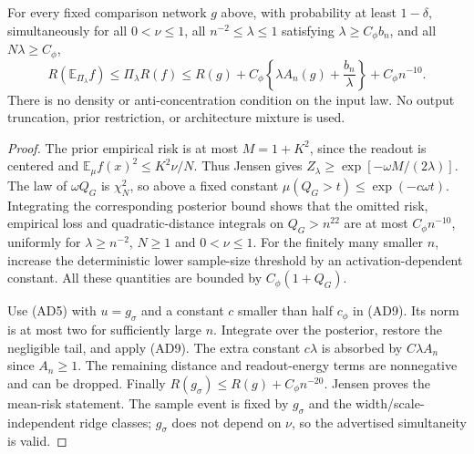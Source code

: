 \begin{theorem}
\label{thm:all-d-sharp}
For every fixed comparison network $g$ above, with probability at least
$1-\delta$, simultaneously for all $0<\nu\le1$, all
$n^{-2}\le\lambda\le1$ satisfying $\lambda\ge C_\phi b_n$, and all
$N\lambda\ge C_\phi$,
\[
 R(\mathbb E_{\Pi_\lambda}f)\le\Pi_\lambda R(f)
 \le R(g)+C_\phi\left\{\lambda A_n(g)+\frac{b_n}{\lambda}\right\}
       +C_\phi n^{-10}.                                \tag{AD10}
\]
There is no density or anti-concentration condition on the input law.
No output truncation, prior restriction, or architecture mixture is used.
\end{theorem}
\begin{proof}
The prior empirical risk is at most $M=1+K^2$, since the readout is
centered and $\mathbb E_\mu f(x)^2\le K^2\nu/N$.
Thus Jensen gives $Z_\lambda\ge\exp[-\omega M/(2\lambda)]$.
The law of $\omega Q_G$ is $\chi^2_N$, so above a fixed constant
$\mu(Q_G>t)\le\exp(-c\omega t)$. Integrating the corresponding
posterior bound shows that the omitted risk, empirical loss and
quadratic-distance integrals on $Q_G>n^{22}$ are at most $C_\phi n^{-10}$,
uniformly for $\lambda\ge n^{-2}$, $N\ge1$ and $0<\nu\le1$.
For the finitely many smaller $n$, increase the deterministic lower
sample-size threshold by an activation-dependent constant.
All these quantities are bounded by $C_\phi(1+Q_G)$.

Use (AD5) with $u=g_\sigma$ and a constant $c$ smaller than half
$c_\phi$ in (AD9). Its norm is at most two for sufficiently large $n$.
Integrate over the posterior, restore the negligible tail, and apply
(AD9). The extra constant $c\lambda$ is absorbed by $C\lambda A_n$
since $A_n\ge1$. The remaining distance and readout-energy terms are nonnegative
and can be dropped. Finally $R(g_\sigma)\le R(g)+C_\phi n^{-20}$.
Jensen proves the mean-risk statement. The sample event is fixed by
$g_\sigma$ and the width/scale-independent ridge classes; $g_\sigma$
does not depend on $\nu$, so the advertised simultaneity is valid.
\end{proof}

